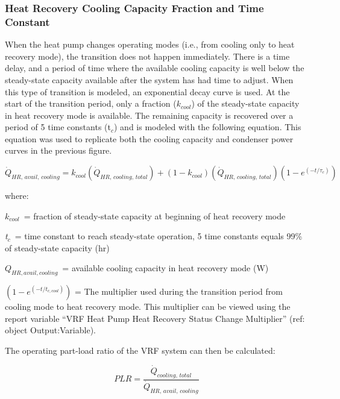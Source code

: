 \subsubsection{Heat Recovery Cooling Capacity Fraction and Time Constant}\label{heat-recovery-cooling-capacity-fraction-and-time-constant}

When the heat pump changes operating modes (i.e., from cooling only to heat recovery mode), the transition does not happen immediately. There is a time delay, and a period of time where the available cooling capacity is well below the steady-state capacity available after the system has had time to adjust. When this type of transition is modeled, an exponential decay curve is used. At the start of the transition period, only a fraction (\(k_{cool}\)) of the steady-state capacity in heat recovery mode is available. The remaining capacity is recovered over a period of 5 time constants (t\(_{c}\)) and is modeled with the following equation. This equation was used to replicate both the cooling capacity and condenser power curves in the previous figure.

\begin{equation}
  \dot{Q}_{HR,\,avail,\,cooling} = k_{cool} \left( \dot{Q}_{HR,\,cooling,\,total} \right) + \left( 1 - k_{cool} \right) \left( \dot{Q}_{HR,\,cooling,\,total} \right) \left( 1 - e^{\left( -t / \tau_c \right)}  \right)
\end{equation}

where:

\(k_{cool}\) = fraction of steady-state capacity at beginning of heat recovery mode

\emph{t}\(_c\) = time constant to reach steady-state operation, 5 time constants equals 99\% of steady-state capacity (hr)

\(Q_{HR,avail,cooling}\) = available cooling capacity in heat recovery mode (W)

\(\left( 1 - e^{\left( -t / t_{c,cool} \right)} \right)\) = The multiplier used during the transition period from cooling mode to heat recovery mode. This multiplier can be viewed using the report variable ``VRF Heat Pump Heat Recovery Status Change Multiplier'' (ref: object Output:Variable).

The operating part-load ratio of the VRF system can then be calculated:

\begin{equation}
  PLR = \frac{\dot{Q}_{cooling,\,total}}{\dot{Q}_{HR,\,avail,\,cooling}}
\end{equation}

